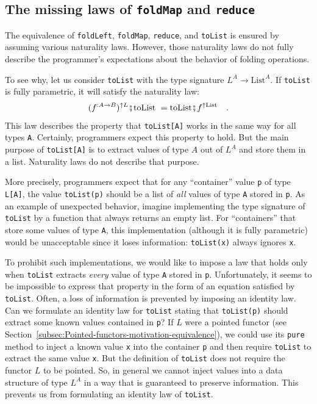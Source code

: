 \subsection{The\label{subsec:The-missing-laws-of-foldMap-and-reduce} missing
laws of \texttt{foldMap} and \texttt{reduce}}

The equivalence of \lstinline!foldLeft!, \lstinline!foldMap!, \lstinline!reduce!,
and \lstinline!toList! is ensured by assuming various naturality
laws. However, those naturality laws do not fully describe the programmer\textsf{'}s
expectations about the behavior of folding operations. 

To see why, let us consider \lstinline!toList! with the type signature
$L^{A}\rightarrow\text{List}^{A}$. If \lstinline!toList! is fully
parametric, it will satisfy the naturality law:
\[
(f^{:A\rightarrow B})^{\uparrow L}\bef\text{toList }=\text{toList}\bef f^{\uparrow\text{List}}\quad.
\]
This law describes the property that \lstinline!toList[A]! works
in the same way for all types \lstinline!A!. Certainly, programmers
expect this property to hold. But the main purpose of \lstinline!toList[A]!
is to extract values of type $A$ out of $L^{A}$ and store them in
a list. Naturality laws do not describe that purpose.

More precisely, programmers expect that for any \textsf{``}container\textsf{''} value
\lstinline!p! of type \lstinline!L[A]!, the value \lstinline!toList(p)!
should be a list of \emph{all} values of type \lstinline!A! stored
in \lstinline!p!. As an example of unexpected behavior, imagine implementing
the type signature of \lstinline!toList! by a function that always
returns an empty list. For \textsf{``}containers\textsf{''} that store some values
of type \lstinline!A!, this implementation (although it is fully
parametric) would be unacceptable since it loses information: \lstinline!toList(x)!
always ignores  \lstinline!x!.

To prohibit such implementations, we would like to impose a law that
holds only when \lstinline!toList! extracts \emph{every} value of
type \lstinline!A! stored in \lstinline!p!. Unfortunately, it seems
to be impossible to express that property in the form of an equation
satisfied by \lstinline!toList!. Often, a loss of information is
prevented by imposing an identity law. Can we formulate an identity
law for \lstinline!toList! stating that \lstinline!toList(p)! should
extract some known values contained in \lstinline!p!? If $L$ were
a pointed functor (see Section~\ref{subsec:Pointed-functors-motivation-equivalence}),
we could use its \lstinline!pure! method to inject a known value
\lstinline!x! into the container \lstinline!p! and then require
\lstinline!toList! to extract the same value \lstinline!x!. But
the definition of \lstinline!toList! does not require the functor
$L$ to be pointed. So, in general we cannot inject values into a
data structure of type $L^{A}$ in a way that is guaranteed to preserve
information. This prevents us from formulating an identity law of
\lstinline!toList!.

